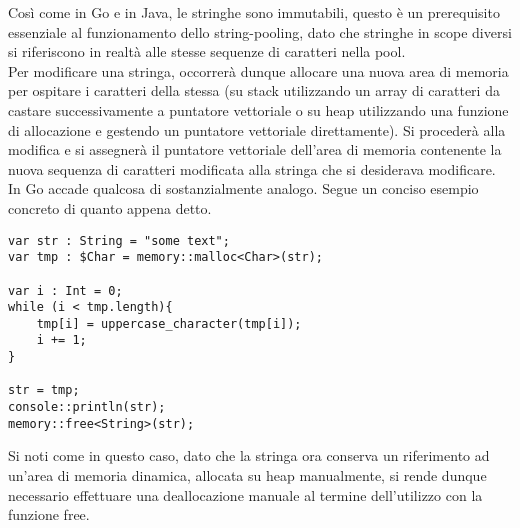 Così come in Go e in Java, le stringhe sono immutabili, questo è un prerequisito essenziale al funzionamento dello string-pooling, dato 
che stringhe in scope diversi si riferiscono in realtà alle stesse sequenze di caratteri nella pool. \\

Per modificare una stringa, occorrerà dunque allocare una nuova area di memoria per ospitare i caratteri della stessa 
(su stack utilizzando un array di caratteri da castare successivamente a puntatore vettoriale o su heap utilizzando una 
funzione di allocazione e gestendo un puntatore vettoriale direttamente). Si procederà alla modifica e si assegnerà il puntatore vettoriale 
dell’area di memoria contenente la nuova sequenza di caratteri modificata alla stringa che si desiderava modificare. In Go 
accade qualcosa di sostanzialmente analogo. Segue un conciso esempio concreto di quanto appena detto. \\

\vspace{0.5cm}
\begin{lstlisting}[frame=single]
var str : String = "some text";
var tmp : $Char = memory::malloc<Char>(str);

var i : Int = 0;
while (i < tmp.length){
    tmp[i] = uppercase_character(tmp[i]);
    i += 1;
}

str = tmp;
console::println(str);
memory::free<String>(str);
\end{lstlisting}
\vspace{0.5cm}


Si noti come in questo caso, dato che la stringa ora conserva un riferimento ad un’area di memoria dinamica, allocata su heap 
manualmente, si rende dunque necessario effettuare una deallocazione manuale al termine dell’utilizzo con la funzione free. \\